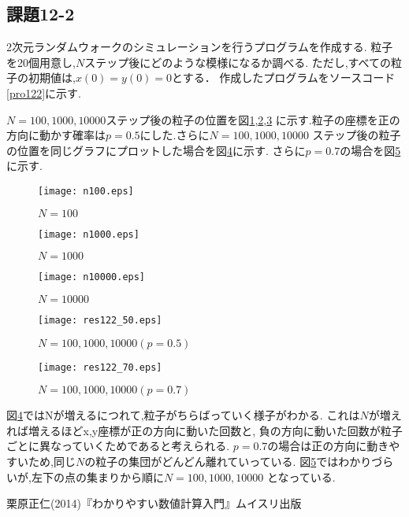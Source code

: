 \documentclass[a4j]{jsarticle}
\begin{document}
\subsection{課題12-2}
2次元ランダムウォークのシミュレーションを行うプログラムを作成する.
粒子を20個用意し,$N$ステップ後にどのような模様になるか調べる.
ただし,すべての粒子の初期値は,$x(0) = y(0) = 0$とする．
作成したプログラムをソースコード\ref{pro122}に示す.



$N=100,1000,10000$ステップ後の粒子の位置を図\ref{n100},\ref{n103},\ref{n104}
に示す.粒子の座標を正の方向に動かす確率は$p=0.5$にした.さらに$N=100,1000,10000$
ステップ後の粒子の位置を同じグラフにプロットした場合を図\ref{nall}に示す.
さらに$p=0.7$の場合を図\ref{nall70}に示す.

\begin{figure}[htbp]
 \centering
 \texttt{[image: n100.eps]}
 \caption{$N=100$}
 \label{n100}
\end{figure}

\begin{figure}[htbp]
 \centering
 \texttt{[image: n1000.eps]}
 \caption{$N=1000$}
 \label{n103}
\end{figure}

\begin{figure}[htbp]
 \centering
 \texttt{[image: n10000.eps]}
 \caption{$N=10000$}
 \label{n104}
\end{figure}

\begin{figure}[htbp]
 \centering
 \texttt{[image: res122\_50.eps]}
 \caption{$N=100,1000,10000(p=0.5)$}
 \label{nall}
\end{figure}

\begin{figure}[htbp]
 \centering
 \texttt{[image: res122\_70.eps]}
 \caption{$N=100,1000,10000(p=0.7)$}
 \label{nall70}
\end{figure}

図\ref{nall}ではNが増えるにつれて,粒子がちらばっていく様子がわかる.
これは$N$が増えれば増えるほどx,y座標が正の方向に動いた回数と,
負の方向に動いた回数が粒子ごとに異なっていくためであると考えられる.
$p=0.7$の場合は正の方向に動きやすいため,同じ$N$の粒子の集団がどんどん離れていっている.
図\ref{nall70}ではわかりづらいが,左下の点の集まりから順に$N=100,1000,10000$
となっている.


\begin{thebibliography}{9}
 栗原正仁(2014)『わかりやすい数値計算入門』ムイスリ出版
\end{thebibliography}
\end{document}
